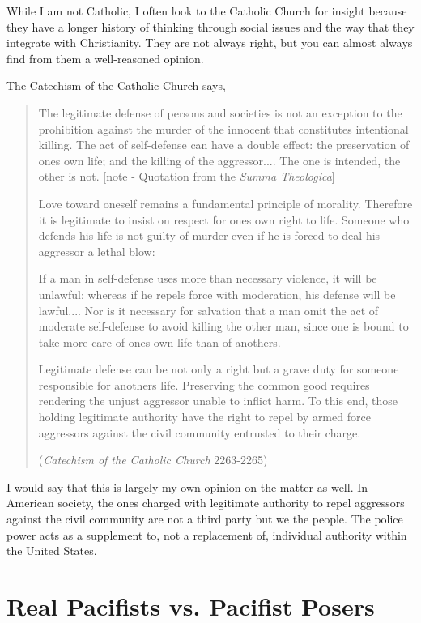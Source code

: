 While I am not Catholic, I often look to the Catholic Church for insight
because they have a longer history of thinking through social issues
and the way that they integrate with Christianity. They are not always
right, but you can almost always find from them a well-reasoned
opinion.

The Catechism of the Catholic Church says, 

\begin{quote}
The legitimate defense of persons and societies is not an exception to
the prohibition against the murder of the innocent that constitutes
intentional killing. {\textquotedbl}The act of self-defense can have a
double effect: the preservation of one{\textquotesingle}s own life; and
the killing of the aggressor.... The one is intended, the other is
not.{\textquotedbl} [note - Quotation from the \textit{Summa
Theologica}]

Love toward oneself remains a fundamental principle of morality.
Therefore it is legitimate to insist on respect for
one{\textquotesingle}s own right to life. Someone who defends his life
is not guilty of murder even if he is forced to deal his aggressor a
lethal blow: 

If a man in self-defense uses more than necessary violence, it will be
unlawful: whereas if he repels force with moderation, his defense will
be lawful.... Nor is it necessary for salvation that a man omit the act
of moderate self-defense to avoid killing the other man, since one is
bound to take more care of one{\textquotesingle}s own life than of
another{\textquotesingle}s.

Legitimate defense can be not only a right but a grave duty for someone
responsible for another{\textquotesingle}s life. Preserving the common
good requires rendering the unjust aggressor unable to inflict harm. To
this end, those holding legitimate authority have the right to repel by
armed force aggressors against the civil community entrusted to their
charge.

(\textit{Catechism of the Catholic Church} 2263-2265) 
\end{quote}

I would say that this is largely my own opinion on the matter as well.
In American society, the ones charged with legitimate authority to
repel aggressors against the civil community
are not a third party
but we the people. The police power acts as a supplement to, not a
replacement of, individual authority within the United States.

\section{Real Pacifists vs. Pacifist Posers}

